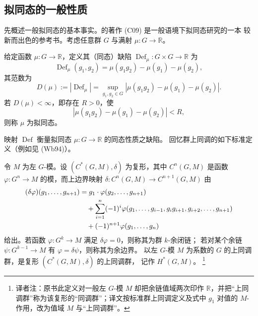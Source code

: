 \subsection{拟同态的一般性质}

先概述一般拟同态的基本事实。\personCalegari{}的著作 (C09) 是一般语境下拟同态研究的一本
较新而出色的参考书。考虑任意群 $G$ 与满射 $\mu:G\to\mathbb R$。

\begin{definition}[拟同态]
\label{def:22-quasimorphism}
给定函数 $\mu:G\to\mathbb R$，定义其（同态）缺陷
$\operatorname{Def}_\mu:G\times G\to\mathbb R$ 为
\[
 \operatorname{Def}_\mu(g_1,g_2)=\mu(g_1g_2)-\mu(g_1)-\mu(g_2),
\]
其范数为
\[
 D(\mu):=|\operatorname{Def}_\mu|
 =\sup_{g_1,g_2\in G}|\mu(g_1g_2)-\mu(g_1)-\mu(g_2)|.
\]
若 $D(\mu)<\infty$，即存在 $R>0$，使
\begin{equation}
 |\mu(g_1g_2)-\mu(g_1)-\mu(g_2)|<R,
 \label{eq:22-quasimorphism-defect}
\end{equation}
则称 $\mu$ 为拟同态。
\end{definition}

映射 $\operatorname{Def}$ 衡量拟同态 $\mu:G\to\mathbb R$ 的同态性质之缺陷。
回忆群上同调的如下标准定义（例如见 (Wb94)）。

\begin{definition}
\label{def:22-group-cohomology}
令 $M$ 为左 $G$-模。设 $(C^*(G,M),\delta)$ 为复形，其中 $C^n(G,M)$ 是函数
$\varphi:G^n\to M$ 的模，而上边界映射
$\delta:C^n(G,M)\to C^{n+1}(G,M)$ 由
\begin{align}
 (\delta\varphi)(g_1,\ldots,g_{n+1})
 &=g_1\cdot\varphi(g_2,\ldots,g_{n+1})\notag\\
 &\quad+\sum_{i=1}^n(-1)^i
 \varphi(g_1,\ldots,g_{i-1},g_ig_{i+1},g_{i+2},\ldots,g_{n+1})\notag\\
 &\quad+(-1)^{n+1}\varphi(g_1,\ldots,g_n)
 \label{eq:22-group-coboundary}
\end{align}
给出。若函数 $\varphi:G^k\to M$ 满足 $\delta\varphi=0$，则称其为群 $k$-余闭链；
若对某个余链 $\psi:G^{k-1}\to M$ 有 $\varphi=\delta\psi$，则称其为余边界。
以左 $G$-模 $M$ 为系数的 $G$ 的上同调群，是复形 $(C^*(G,M),\delta)$ 的上同调群，
记作 $H^*(G,M)$。
\footnote{译者注：原书此定义对一般左 $G$-模 $M$ 却把余链值域两次印作
$\mathbb R$，并把“上同调群”称为该复形的“同调群”；译文按标准群上同调定义及式中
$g_1$ 对值的 $M$-作用，改为值域 $M$ 与“上同调群”。}
\end{definition}

